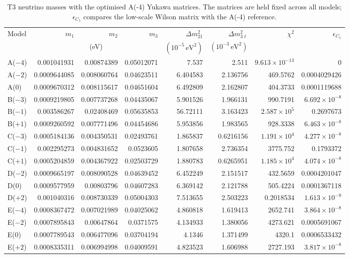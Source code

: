 \begin{table}[p]
\centering
\caption{T3 neutrino masses with the optimised A(-4) Yukawa matrices. The matrices are held fixed across all models; $\epsilon_{C_5}$ compares the low-scale Wilson matrix with the A(-4) reference.}
\label{tab:appC_Am4_masses}
\begingroup
\footnotesize
\setlength{\tabcolsep}{3.2pt}
\begin{tabular}{lrrrrrrr}
\hline
Model & $m_1$ & $m_2$ & $m_3$ & $\Delta m^2_{21}$ & $\Delta m^2_{3\ell}$ & $\chi^2$ & $\epsilon_{C_5}$ \\
 & \multicolumn{3}{c}{(eV)} & $(10^{-5}\,\mathrm{eV}^2)$ & $(10^{-3}\,\mathrm{eV}^2)$ &  &  \\
\hline
A($-4$) & 0.001041931 & 0.00874389 & 0.05012071 & 7.537 & 2.511 & $9.613\times10^{-13}$ & 0 \\
A($-2$) & 0.0009644085 & 0.008060764 & 0.04623511 & 6.404583 & 2.136756 & 469.5762 & 0.0004029426 \\
A($0$) & 0.0009670312 & 0.008115617 & 0.04651604 & 6.492809 & 2.162807 & 404.3733 & 0.0001119688 \\
B($-3$) & 0.0009219805 & 0.007737268 & 0.04435067 & 5.901526 & 1.966131 & 990.7191 & $6.692\times10^{-8}$ \\
B($-1$) & 0.003586267 & 0.02408469 & 0.05635853 & 56.72111 & 3.163423 & $2.587\times10^{5}$ & 0.2697673 \\
B($+1$) & 0.0009260592 & 0.007771496 & 0.04454686 & 5.953856 & 1.983565 & 928.3338 & $6.463\times10^{-8}$ \\
C($-3$) & 0.0005184136 & 0.004350531 & 0.02493761 & 1.865837 & 0.6216156 & $1.191\times10^{4}$ & $4.277\times10^{-8}$ \\
C($-1$) & 0.002295273 & 0.004831652 & 0.0523605 & 1.807658 & 2.736354 & 3775.752 & 0.1793372 \\
C($+1$) & 0.0005204859 & 0.004367922 & 0.02503729 & 1.880783 & 0.6265951 & $1.185\times10^{4}$ & $4.074\times10^{-8}$ \\
D($-2$) & 0.0009665197 & 0.008090528 & 0.04639452 & 6.452249 & 2.151517 & 432.5659 & 0.0004201047 \\
D($0$) & 0.0009577959 & 0.00803796 & 0.04607283 & 6.369142 & 2.121788 & 505.4224 & 0.0001367118 \\
D($+2$) & 0.001040316 & 0.008730339 & 0.05004303 & 7.513655 & 2.503223 & 0.2018534 & $1.613\times10^{-9}$ \\
E($-4$) & 0.0008367472 & 0.007021989 & 0.04025062 & 4.860818 & 1.619413 & 2652.741 & $3.864\times10^{-8}$ \\
E($-2$) & 0.0007895843 & 0.00647864 & 0.0371575 & 4.134933 & 1.380056 & 4273.621 & 0.0005691067 \\
E($0$) & 0.0007789543 & 0.006477096 & 0.03704194 & 4.1346 & 1.371499 & 4320.1 & 0.0006533432 \\
E($+2$) & 0.0008335311 & 0.006994998 & 0.04009591 & 4.823523 & 1.606988 & 2727.193 & $3.817\times10^{-8}$ \\
\hline
\end{tabular}
\endgroup
\end{table}
